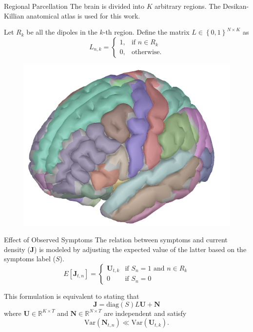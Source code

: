 \documentclass[progressbar=head]{beamer}
\newcommand{\set}[1]{ \left\{ #1 \right\} }
\newcommand{\ppar}[1]{ \left( #1 \right) }
\newcommand{\spar}[1]{ \left[ #1 \right] }
\newcommand{\J}{\mathbf{J}}
\newcommand{\U}{\mathbf{U}}
\newcommand{\N}{\mathbf{N}}
\newcommand{\R}{\mathbb{R}}
\begin{document}
\begin{frame}{Regional Parcellation}
The brain is divided into $K$ arbitrary regions. The Desikan-Killian anatomical atlas is used for this work.

Let $R_k$ be all the dipoles in the $k$-th region. Define the matrix $L\in \set{0,1}^{N\times K}$ as
\begin{equation}
    L_{n,k} = \begin{cases}
        1, &\text{if } n\in R_k \\
        0, &\text{otherwise.}
    \end{cases}
\end{equation}

\begin{figure}
\centering
\includegraphics[width=0.3\linewidth]{./img_oldbeamer/desikan}

\end{figure}

\end{frame}

\begin{frame}{Effect of Observed Symptoms}
The relation between symptoms and current density ($\J$) is modeled by adjusting the expected value of the latter based on the symptoms label ($S$).
\begin{equation}
    E\spar{\J_{t,n}} = 
    \begin{cases}
        \U_{t,k} & \text{if } S_n=1 \text{ and } n\in R_k \\
        0 & \text{if } S_n=0
    \end{cases}
\end{equation}

This formulation is equivalent to stating that
\begin{equation}
    \J = \text{diag}\ppar{S} L \U + \N
\end{equation}
where $\mathbf{U}\in \R^{K\times T}$ and $\mathbf{N}\in \R^{N\times T}$ are independent and satisfy
\begin{equation}
    \text{Var}\ppar{\N_{t,n}} \ll \text{Var}\ppar{\U_{t,k}}.
\end{equation}
\end{frame}
\end{document}
